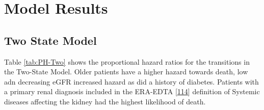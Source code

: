 \documentclass[12pt,PhD,twoside,openright]{muthesis}
\begin{document}
\hypertarget{model-results}{%
\section{Model Results}\label{model-results}}

\hypertarget{two-state-model}{%
\subsection{Two State Model}\label{two-state-model}}

Table \ref{tab:PH-Two} shows the proportional hazard ratios for the transitions in the Two-State Model. Older patients have a higher hazard towards death, low adn decreasing eGFR increased hazard as did a history of diabetes. Patients with a primary renal diagnosis included in the ERA-EDTA {[}\protect\hyperlink{ref-venkat-raman_new_2012}{114}{]} definition of Systemic diseases affecting the kidney had the highest likelihood of death.
\end{document}
